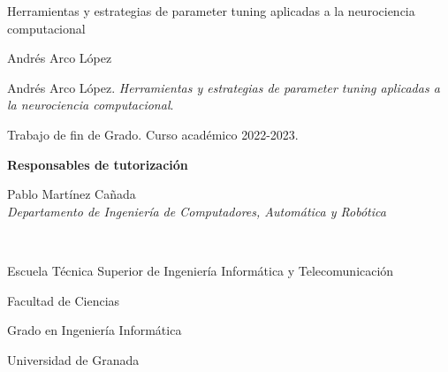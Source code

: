 

\newcommand{\miTitulo}{Herramientas y estrategias de parameter tuning aplicadas a la neurociencia computacional\xspace}
\newcommand{\miNombre}{Andrés Arco López\xspace}
\newcommand{\miGrado}{Grado en Ingeniería Informática}
\newcommand{\miFacultadC}{Facultad de Ciencias}
\newcommand{\miFacultadI}{Escuela Técnica Superior de Ingeniería Informática y Telecomunicación}
\newcommand{\miUniversidad}{Universidad de Granada}
\newcommand{\miTutorI}{
  Pablo Martínez Cañada \\ \emph{Departamento de Ingeniería de Computadores, Automática y Robótica}
}

\newcommand{\miCurso}{2022-2023\xspace}

\thispagestyle{empty}

\begin{center}
  \large


  \begingroup
  \huge{\miTitulo} \\ \bigskip
  \endgroup

  \textrm{\miNombre}


\end{center}

\newpage
\thispagestyle{empty}

\hfill

\vfill

\noindent\miNombre. \textit{\miTitulo}.

Trabajo de fin de Grado. Curso académico \miCurso.

\begin{minipage}[t]{0.25\textwidth}
  \flushleft
  \textbf{Responsables de tutorización}
\end{minipage}
\begin{minipage}[t]{0.45\textwidth}
  \flushleft
  \miTutorI
  \medskip \\
\end{minipage}
\begin{minipage}[t]{0.30\textwidth}
  \flushright

  \miFacultadI
  \medskip

  \miFacultadC
  \medskip \medskip
  
  \miGrado
  \medskip
  
  \miUniversidad
\end{minipage}
\begin{flushleft}
\end{flushleft}

\endinput

